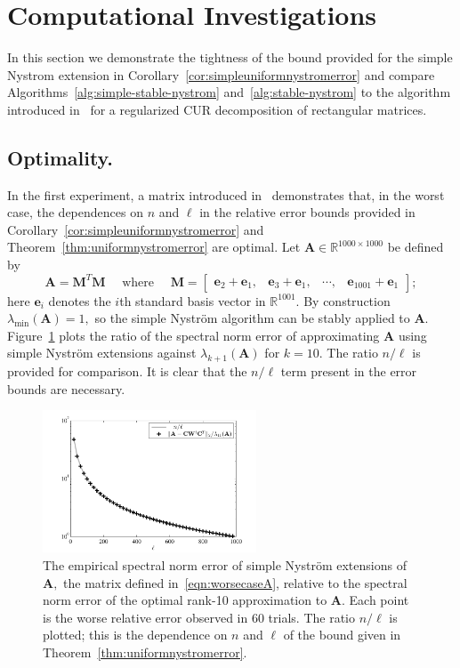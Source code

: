 \documentclass[11pt,letterpaper,twoside,reqno,nosumlimits]{amsart}
\def\transp{T}
\newcommand{\mat}[1]{\ensuremath{\mathbf{#1}}}
\renewcommand{\vec}[1]{\ensuremath{\mathbf{#1}}}
\newcommand{\R}{\ensuremath{\mathbb{R}}}
\newcommand{\lambdamin}[1]{\ensuremath{\lambda_{\mathrm{min}}\left(#1\right)}}
\theoremstyle{remark}
\begin{document}
\section{Computational Investigations}
\label{sec:experiments}

In this section we demonstrate the tightness of the bound provided for the simple Nystrom extension in Corollary~\ref{cor:simpleuniformnystromerror} and compare Algorithms~\ref{alg:simple-stable-nystrom} and~\ref{alg:stable-nystrom} to the algorithm introduced in~\cite{CD11} for a regularized CUR decomposition of rectangular matrices. 

\subsection*{Optimality.}
In the first experiment, a matrix introduced in~\cite{BDM11} demonstrates that, in the worst case, the dependences on $n$ and $\ell$ in the relative error bounds provided in Corollary~\ref{cor:simpleuniformnystromerror} and Theorem~\ref{thm:uniformnystromerror} are optimal.
Let $\mat{A} \in \R^{1000 \times 1000}$ be defined by
\begin{equation}
\mat{A} = \mat{M}^\transp \mat{M} \quad \text{ where } \quad 
 \mat{M} = [\begin{matrix} \vec{e}_2 + \vec{e}_1, & \vec{e}_3 + \vec{e}_1, & \cdots, & \vec{e}_{1001} + \vec{e}_1 \end{matrix}];
 \label{eqn:worsecaseA}
\end{equation}
here $\vec{e}_i$ denotes the $i$th standard basis vector in $\R^{1001}.$ By construction $\lambdamin{\mat{A}} = 1,$ so the simple Nystr\"om algorithm can be stably applied to $\mat{A}.$
Figure~\ref{fig:optimality} plots the ratio of the spectral norm error of approximating $\mat{A}$ using simple Nystr\"om extensions against $\lambda_{k+1}(\mat{A})$ for $k= 10.$ The ratio $n/\ell$ is provided for comparison. It is clear that the $n/\ell$ term present in the error bounds are necessary.

\begin{figure}[tb]
 \centering
 \includegraphics[width=2.5in,keepaspectratio=true]{./experiments/optimalityverification.pdf}
 \caption{The empirical spectral norm error of simple Nystr\"om extensions of $\mat{A},$ the matrix defined in~\eqref{eqn:worsecaseA}, relative to the spectral norm error of the optimal rank-10 approximation to $\mat{A}$. Each point is the worse relative error observed in 60 trials. The ratio $n/\ell$ is plotted; this is the dependence on $n$ and $\ell$ of the bound given in Theorem~\ref{thm:uniformnystromerror}.}
 \label{fig:optimality}
\end{figure}
\end{document}
